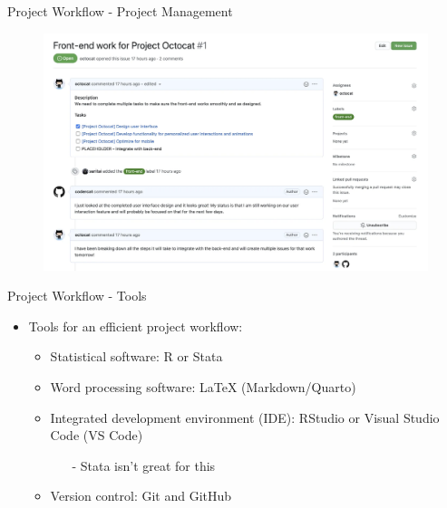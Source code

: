 \documentclass{beamer}
\begin{document}
\begin{frame}{Project Workflow - Project Management}
    \begin{figure}
        \includegraphics[scale=0.45]{manage.png}
    \end{figure}    
\end{frame}

\begin{frame}{Project Workflow - Tools}
    \begin{itemize}
        \item Tools for an efficient project workflow:
        \smallskip
            \begin{itemize}
                \item Statistical software: R or Stata
                \smallskip
                \item Word processing software: LaTeX (Markdown/Quarto)
                \smallskip
                \item Integrated development environment (IDE): RStudio or Visual Studio Code (VS Code)
                \smallskip
                \begin{itemize}
                    \item[-] Stata isn't great for this
                \end{itemize}
                \smallskip
                \item Version control: Git and GitHub
            \end{itemize}
        \end{itemize}
\end{frame}
\end{document}
